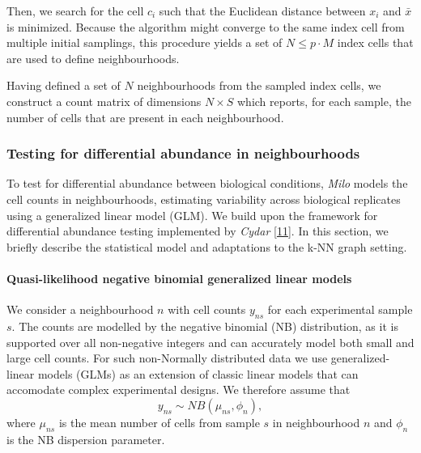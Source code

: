 \documentclass[
]{article}
\begin{document}
Then, we search for the cell \(c_i\) such that the Euclidean distance between \(x_i\) and \(\bar{x}\) is minimized. Because the algorithm might converge to the same index cell from multiple initial samplings, this procedure yields a set of \(N \leq p \cdot M\) index cells that are used to define neighbourhoods.

Having defined a set of \(N\) neighbourhoods from the sampled index cells, we construct a count matrix of dimensions \(N \times S\) which reports, for each sample, the number of cells that are present in each neighbourhood.

\hypertarget{testDA}{%
\subsubsection{Testing for differential abundance in neighbourhoods}\label{testDA}}

To test for differential abundance between biological conditions, \emph{Milo} models the cell counts in neighbourhoods, estimating variability across biological replicates using a generalized linear model (GLM). We build upon the framework for differential abundance testing implemented by \emph{Cydar} {[}\protect\hyperlink{ref-lunTestingDifferentialAbundance2017}{11}{]}. In this section, we briefly describe the statistical model and adaptations to the k-NN graph setting.

\hypertarget{quasi-likelihood-negative-binomial-generalized-linear-models}{%
\paragraph*{Quasi-likelihood negative binomial generalized linear models}\label{quasi-likelihood-negative-binomial-generalized-linear-models}}

We consider a neighbourhood \(n\) with cell counts \(y_{ns}\) for each experimental sample \(s\). The counts are modelled by the negative binomial (NB) distribution, as it is supported over all non-negative integers and can accurately model both small and large cell counts. For such non-Normally distributed data we use generalized-linear models (GLMs) as an extension of classic linear models that can accomodate complex experimental designs. We therefore assume that
\[
y_{ns} \sim NB(\mu_{ns},\phi_{n}),
\]
where \(\mu_{ns}\) is the mean number of cells from sample \(s\) in neighbourhood \(n\) and \(\phi_{n}\) is the NB dispersion parameter.
\end{document}
